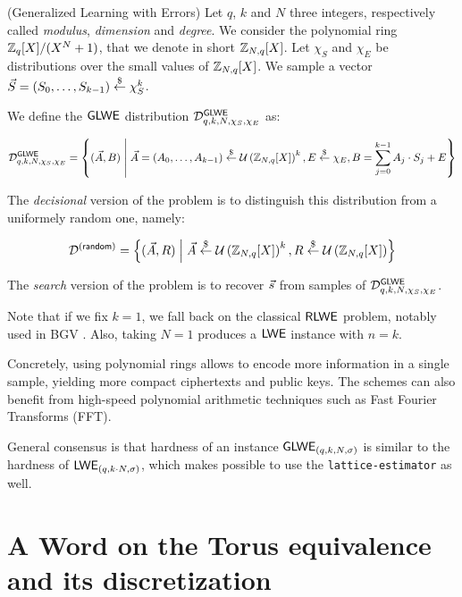 \begin{definition}
	(Generalized Learning with Errors) Let $q$, $k$ and $N$ three integers, respectively called \textit{modulus}, \textit{dimension} and \textit{degree}. We consider the polynomial ring $\mathbb{Z}_q[X] / (X^N + 1)$, that we denote in short $\mathbb{Z}_{N,q}[X]$. Let $\chi_S$ and $\chi_E$ be distributions over the small values of $\mathbb{Z}_{N,q}[X]$. We sample a vector $\vec S = (S_0, \dots, S_{k-1}) \overset{\$}{\leftarrow} \chi_S^k$. 
	
	We define the $\textsf{GLWE}$ distribution $\mathcal{D}_{q, k, N, \chi_S, \chi_E}^{\textsf{GLWE}}$ as:
	
	\[
	\mathcal{D}_{q, k, N, \chi_S, \chi_E}^{\textsf{GLWE}} = \left \{ (\vec A, B) \;\middle|\; \vec A = (A_0, \dots, A_{k-1}) \overset{\$}{\leftarrow} \mathcal U \left ( \mathbb{Z}_{N,q}[X] \right )^k, E \overset{\$}{\leftarrow} \chi_E, B = \sum_{j=0}^{k-1} A_j \cdot S_j + E \right \}
	\]
	
	The \textit{decisional} version of the problem is to distinguish this distribution from a uniformely random one, namely:
	
	\[
	\mathcal{D}^{(\textsf{random})} = \left \{(\vec A, R) \;\middle|\; \vec A \overset{\$}{\leftarrow} \mathcal U \left ( \mathbb{Z}_{N,q}[X] \right )^k, R \overset{\$}{\leftarrow} \mathcal U \left ( \mathbb{Z}_{N,q}[X] \right ) \right\}
	\]
	
	The \emph{search} version of the problem is to recover $\vec s$ from samples of $\mathcal{D}_{q, k , N, \chi_S, \chi_E}^{\textsf{GLWE}}$. 
	\label{def:GLWE}
	
\end{definition}

Note that if we fix $k = 1$, we fall back on the classical $\textsf{RLWE}$ problem, notably used in BGV \cite{bgv}. Also, taking $N=1$ produces a $\textsf{LWE}$ instance with $n = k$. 

Concretely, using polynomial rings allows to encode more information in a single sample, yielding more compact ciphertexts and public keys. The schemes can also benefit from high-speed polynomial arithmetic techniques such as Fast Fourier Transforms (FFT). 

General consensus is that hardness of an instance $\textsf{GLWE}_{(q, k, N, \sigma)}$ is similar to the hardness of $\textsf{LWE}_{(q, k \cdot N, \sigma)}$, which makes possible to use the \texttt{lattice-estimator} as well.




\section{A Word on the Torus equivalence and its discretization}
\label{sec:torus_equivalence}


